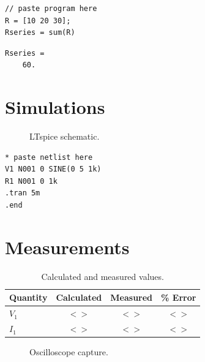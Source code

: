 \documentclass[11pt]{article}
\begin{document}
\begin{lstlisting}[style=scilab, caption={SciLab program.}]
// paste program here
R = [10 20 30];
Rseries = sum(R)
\end{lstlisting}

\begin{lstlisting}[style=console, caption={SciLab runtime output.}]
 Rseries =
    60.
\end{lstlisting}

\section*{Simulations}
\begin{figure}[H]
    \centering
    \caption{LTspice schematic.}
\end{figure}

\begin{lstlisting}[style=netlist, caption={LTspice netlist.}]
* paste netlist here
V1 N001 0 SINE(0 5 1k)
R1 N001 0 1k
.tran 5m
.end
\end{lstlisting}

\section*{Measurements}
\begin{table}[H]
    \centering
    \caption{Calculated and measured values.}
    \begin{tabular}{lccc}
        \toprule
        Quantity & Calculated & Measured & \% Error \\
        \midrule
        $V_1$ & <\ > & <\ > & <\ > \\
        $I_1$ & <\ > & <\ > & <\ > \\
        \bottomrule
    \end{tabular}
\end{table}

\begin{figure}[H]
    \centering
    \caption{Oscilloscope capture.}
\end{figure}
\end{document}
